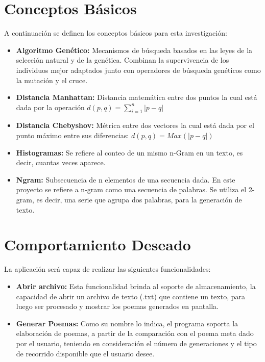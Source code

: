\documentclass[journal]{IEEEtran}
\begin{document}
 
\section{Conceptos Básicos}

A continuación se definen los conceptos básicos para esta investigación:\\
	
	\begin{itemize}
	\item{\bf Algoritmo Genético:} Mecanismos de búsqueda basados en las leyes de la selección natural y de la genética. Combinan la supervivencia de los individuos mejor adaptados junto con operadores de búsqueda genéticos como la mutación y el cruce.
	\item{\bf Distancia Manhattan:} Distancia matemática entre dos puntos la cual está dada por la operación $d(p,q) =\sum_{i=1}^{n}|p-q|$
	\item{\bf Distancia Chebyshov:} Métrica entre dos vectores la cual está dada por el punto máximo entre sus diferencias: $d(p,q) = Max(|p-q|)$
	\item{\bf Histogramas:}  Se refiere al conteo de un mismo n-Gram en un texto, es decir, cuantas veces aparece.
	\item{\bf Ngram:}  Subsecuencia de n elementos de una secuencia dada. En este proyecto se refiere a n-gram como una secuencia de palabras. Se utiliza el 2-gram, es decir, una serie que agrupa dos palabras, para la generación de texto.
	\end{itemize}

\newpage
\section{Comportamiento Deseado}

La aplicación será capaz de realizar las siguientes funcionalidades:

\begin{itemize}
	
	\item{\bf Abrir archivo:} Esta funcionalidad brinda al soporte de almacenamiento, la capacidad de abrir un archivo de texto (.txt) que contiene un texto, para luego ser procesado y mostrar los poemas generados en pantalla.
	
\end{itemize}	
	

\begin{itemize}
		
	\item{\bf Generar Poemas:}  Como su nombre lo indica, el programa soporta la elaboración de poemas, a partir de la comparación con el poema meta dado por el usuario, teniendo en consideración el número de generaciones y el tipo de recorrido disponible que el usuario desee.
\end{itemize}	
\end{document}
